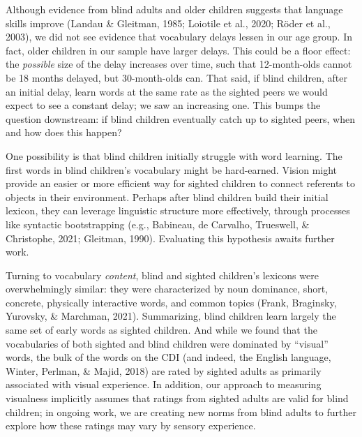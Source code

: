 \documentclass[
  man,floatsintext]{apa6}
\begin{document}
Although evidence from blind adults and older children suggests that language skills improve (Landau \& Gleitman, 1985; Loiotile et al., 2020; Röder et al., 2003), we did not see evidence that vocabulary delays lessen in our age group. In fact, older children in our sample have larger delays. This could be a floor effect: the \emph{possible} size of the delay increases over time, such that 12-month-olds cannot be 18 months delayed, but 30-month-olds can. That said, if blind children, after an initial delay, learn words at the same rate as the sighted peers we would expect to see a constant delay; we saw an increasing one. This bumps the question downstream: if blind children eventually catch up to sighted peers, when and how does this happen?

One possibility is that blind children initially struggle with word learning. The first words in blind children's vocabulary might be hard-earned. Vision might provide an easier or more efficient way for sighted children to connect referents to objects in their environment. Perhaps after blind children build their initial lexicon, they can leverage linguistic structure more effectively, through processes like syntactic bootstrapping (e.g., Babineau, de Carvalho, Trueswell, \& Christophe, 2021; Gleitman, 1990). Evaluating this hypothesis awaits further work.

Turning to vocabulary \emph{content}, blind and sighted children's lexicons were overwhelmingly similar: they were characterized by noun dominance, short, concrete, physically interactive words, and common topics (Frank, Braginsky, Yurovsky, \& Marchman, 2021). Summarizing, blind children learn largely the same set of early words as sighted children. And while we found that the vocabularies of both sighted and blind children were dominated by ``visual'' words, the bulk of the words on the CDI (and indeed, the English language, Winter, Perlman, \& Majid, 2018) are rated by sighted adults as primarily associated with visual experience. In addition, our approach to measuring visualness implicitly assumes that ratings from sighted adults are valid for blind children; in ongoing work, we are creating new norms from blind adults to further explore how these ratings may vary by sensory experience.
\end{document}
